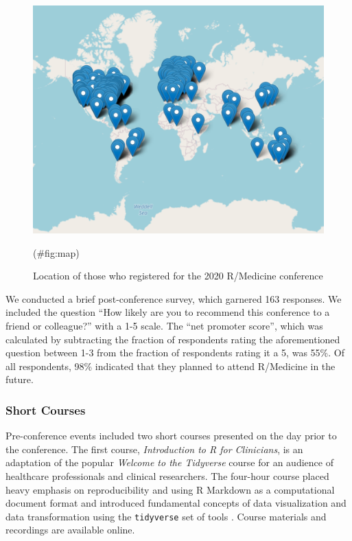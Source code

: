 \begin{Schunk}
\begin{figure}

{\centering \includegraphics[width=0.7\linewidth]{Figure} 

}

\caption[Location of those who registered for the 2020 R/Medicine conference]{Location of those who registered for the 2020 R/Medicine conference}(\#fig:map)
\end{figure}
\end{Schunk}

We conducted a brief post-conference survey, which garnered 163
responses. We included the question ``How likely are you to recommend
this conference to a friend or colleague?'' with a 1-5 scale. The ``net
promoter score'', which was calculated by subtracting the fraction of
respondents rating the aforementioned question between 1-3 from the
fraction of respondents rating it a 5, was 55\%. Of all respondents,
98\% indicated that they planned to attend R/Medicine in the future.

\hypertarget{short-courses}{%
\subsubsection{Short Courses}\label{short-courses}}

Pre-conference events included two short courses presented on the day
prior to the conference. The first course, \emph{Introduction to R for
Clinicians}, is an adaptation of the popular \emph{Welcome to the
Tidyverse} course \citep{tidyclass} for an audience of healthcare
professionals and clinical researchers. The four-hour course placed
heavy emphasis on reproducibility and using R Markdown as a
computational document format and introduced fundamental concepts of
data visualization and data transformation using the \texttt{tidyverse}
set of tools \citep{Wickham2019}. Course materials \citep{introcourse}
and recordings \citep{introhear} are available online.

